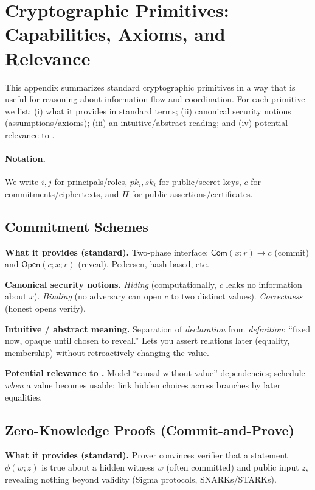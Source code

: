 \section{Cryptographic Primitives: Capabilities, Axioms, and Relevance}
\label{app:crypto}

This appendix summarizes standard cryptographic primitives in a way that is
useful for reasoning about information flow and coordination. For each
primitive we list: (i) what it provides in standard terms; (ii) canonical
security notions (assumptions/axioms); (iii) an intuitive/abstract reading; and
(iv) potential relevance to \KFOL.

\paragraph{Notation.}
We write $i,j$ for principals/roles, $pk_i,sk_i$ for public/secret keys,
$c$ for commitments/ciphertexts, and $\Pi$ for public assertions/certificates.

\subsection{Commitment Schemes}
\textbf{What it provides (standard).}
Two-phase interface: $\mathsf{Com}(x;r)\to c$ (commit) and
$\mathsf{Open}(c;x;r)$ (reveal). Pedersen, hash-based, etc.

\textbf{Canonical security notions.}
\emph{Hiding} (computationally, $c$ leaks no information about $x$).
\emph{Binding} (no adversary can open $c$ to two distinct values).
\emph{Correctness} (honest opens verify).

\textbf{Intuitive / abstract meaning.}
Separation of \emph{declaration} from \emph{definition}: “fixed now, opaque
until chosen to reveal.” Lets you assert relations later (equality, membership)
without retroactively changing the value.

\textbf{Potential relevance to \KFOL.}
Model “causal without value” dependencies; schedule \emph{when} a value becomes
usable; link hidden choices across branches by later equalities.

\subsection{Zero-Knowledge Proofs (Commit-and-Prove)}
\textbf{What it provides (standard).}
Prover convinces verifier that a statement $\phi(w;z)$ is true about a hidden
witness $w$ (often committed) and public input $z$, revealing nothing beyond
validity (Sigma protocols, SNARKs/STARKs).

